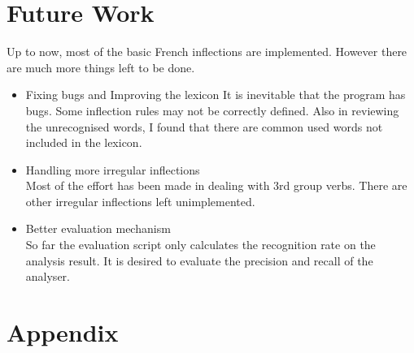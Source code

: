 \documentclass[11pt,letterpaper]{article}
\begin{document}
\section{Future Work}
Up to now, most of the basic French inflections are implemented. However there are much more things left to be done.
\begin{itemize}
\item Fixing bugs and Improving the lexicon
It is inevitable that the program has bugs. Some inflection rules may not be correctly defined. Also in reviewing the unrecognised words, I found that there are common used words not included in the lexicon.
\item Handling more irregular inflections\\
Most of the effort has been made in dealing with 3rd group verbs. There are other irregular inflections left unimplemented.
\item Better evaluation mechanism\\
So far the evaluation script only calculates the recognition rate on the analysis result. It is desired to evaluate the precision and recall of the analyser.
\end{itemize}
\section{Appendix}
\end{document}
